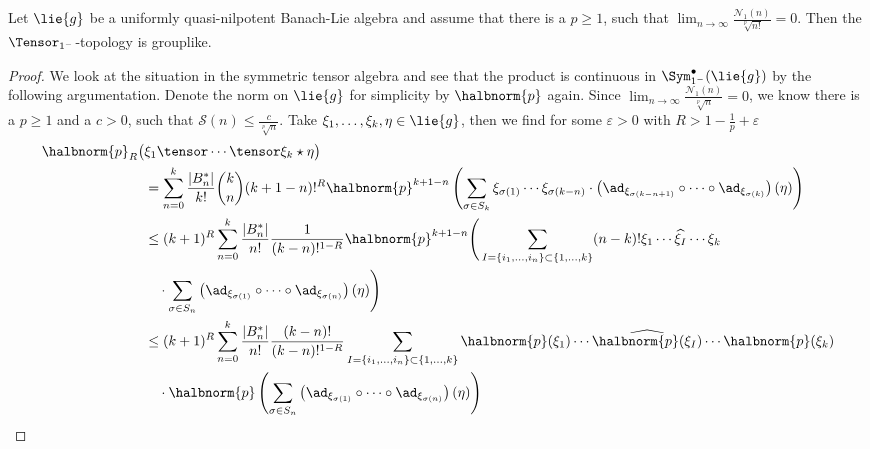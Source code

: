 \documentclass[
11pt,                          %
english                        %
]{article}
\begin{document}
\begin{proposition}
	\label{prop:mainthm_rev_1}
	Let $\lie{g}$ be a uniformly quasi-nilpotent Banach-Lie algebra and assume that 
	there is a $p \geq 1$, such that $\lim_{n \rightarrow \infty} 
	\frac{\mathcal{N}_1(n)}{\sqrt[p]{n!}} = 0$. Then the $\Tensor_{1^-}$-topology is 
	grouplike.
\end{proposition}
\begin{proof}
	We look at the situation in the symmetric tensor 
	algebra and see that the product is continuous in $\Sym_{1^-}^{\bullet}
	(\lie{g})$ by the following argumentation. Denote the norm on $\lie{g}$ 
	for simplicity by $\halbnorm{p}$ again. Since $\lim_{n \rightarrow \infty} 
	\frac{\mathcal{N}_1(n)}{\sqrt[p]{n}} = 0$, we know there is a $p \geq 1$ and a 
	$c > 0$, such that $\mathcal{S}(n) \leq \frac{c}{\sqrt[p]{n}}$. Take $\xi_1, 
	\ldots, \xi_k, \eta \in \lie{g}$, then we find for some $\varepsilon > 0$ with 
	$R > 1 - \frac{1}{p} + \varepsilon$
	\begin{align*}
		\halbnorm{p}_R \big(
		&
			\xi_1 \tensor \cdots \tensor \xi_k
			\star
			\eta
		\big)
		\\
		&=
		\sum\limits_{n = 0}^k
		\frac{|B_n^*|}{k!} \binom{k}{n}
		(k + 1 - n)!^R
		\halbnorm{p}^{k+1-n}
		\left(
			\sum	\limits_{\sigma \in S_k}
			\xi_{\sigma(1)} \cdots \xi_{\sigma(k-n)}
			\cdot
			\left( 
				\ad_{\xi_{\sigma(k-n+1)}} 
				\circ \cdots \circ
				\ad_{\xi_{\sigma(k)}}
			\right)
			(\eta)
		\right)
		\\
		& \leq
		(k + 1)^R
		\sum\limits_{n = 0}^k
		\frac{|B_n^*|}{n!}
		\frac{1}{(k-n)!^{1 - R}}
		\halbnorm{p}^{k+1-n}
		\Bigg(
			\sum\limits_{
				I = \{i_1, \ldots, i_n\} \subset \{1, \ldots, k\}
			}
			(n-k)!
			\xi_1 \cdots \widehat{\xi_I} \cdots \xi_k
		\\
		& \quad \cdot
			\sum	\limits_{\sigma \in S_n}
			\left( 
				\ad_{\xi_{\sigma(1)}} 
				\circ \cdots \circ
				\ad_{\xi_{\sigma(n)}}
			\right)
			(\eta)
		\Bigg)
		\\
		& \leq
		(k + 1)^R
		\sum\limits_{n = 0}^k
		\frac{|B_n^*|}{n!}
		\frac{(k-n)!}{(k-n)!^{1 - R}}
		\sum\limits_{
			I = \{i_1, \ldots, i_n\} \subset \{1, \ldots, k\}
		}
		\halbnorm{p}(\xi_1) 
		\cdots \widehat{\halbnorm{p}(\xi_I)} \cdots 
		\halbnorm{p}(\xi_k)
		\\
		& \quad \cdot
		\halbnorm{p} \left(
			\sum	\limits_{\sigma \in S_n}
			\left( 
				\ad_{\xi_{\sigma(1)}} 
				\circ \cdots \circ
				\ad_{\xi_{\sigma(n)}}
			\right)
			(\eta)
		\right)
		\\

\end{align*}
\end{proof}
\end{document}
